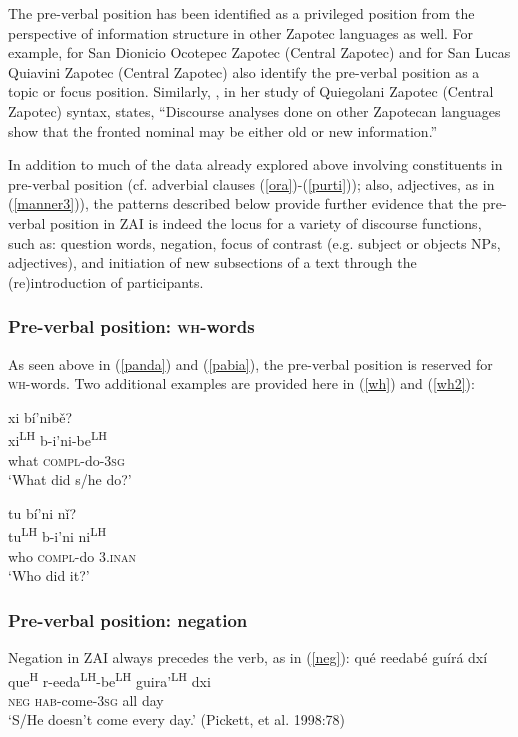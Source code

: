 The pre-verbal position has been identified as a privileged position from the perspective of information structure in other Zapotec languages as well. For example, \citet{broadwell2002} for San Dionicio Ocotepec Zapotec (Central Zapotec) and \citet{lee2000} for San Lucas Quiavini Zapotec (Central Zapotec) also identify the pre-verbal position as a topic or focus position. Similarly, \citet[103]{black2000}, in her study of Quiegolani Zapotec (Central Zapotec) syntax, states, ``Discourse analyses done on other Zapotecan languages show that the fronted nominal may be either old or new information.'' 

In addition to much of the data already explored above involving constituents in pre-verbal position (cf. adverbial clauses (\ref{ora})-(\ref{purti})); also, adjectives, as in  (\ref{manner3})), the patterns described below provide further evidence that the pre-verbal position in ZAI is indeed the locus for a variety of discourse functions, such as: question words, negation, focus of contrast (e.g. subject or objects NPs, adjectives), and initiation of new subsections of a text through the (re)introduction of participants.

\subsubsection{Pre-verbal position: \textsc{wh}-words}
As seen above in (\ref{panda}) and (\ref{pabia}), the pre-verbal position is reserved for \textsc{wh}-words. Two additional examples are provided here in (\ref{wh}) and (\ref{wh2}): 

\ea\label{wh}
xi b\'{i}'nib\v{e}? \\
xi\textsuperscript{LH} b-i'ni-be\textsuperscript{LH} \\
what \textsc{compl}-do-3\textsc{sg} \\
\glt `What did s/he do?' 
\z

\ea\label{wh2}
tu b\'{i}'ni n\v{i}? \\
tu\textsuperscript{LH} b-i'ni ni\textsuperscript{LH} \\
who \textsc{compl}-do 3.\textsc{inan} \\
\glt `Who did it?'  
\z

\subsubsection{Pre-verbal position: negation}
Negation in ZAI always precedes the verb, as in (\ref{neg}):
\ea\label{neg}
\glll qu\'{e} reedab\'{e} gu\'{i}r\'{a} dx\'{i} \\
 que\textsuperscript{H} r-eeda\textsuperscript{LH}-be\textsuperscript{LH} guira'\textsuperscript{LH} dxi \\
\textsc{neg} \textsc{hab}-come-3\textsc{sg} all day \\
\glt `S/He doesn't come every day.' \hfill (Pickett, et al. 1998:78)

